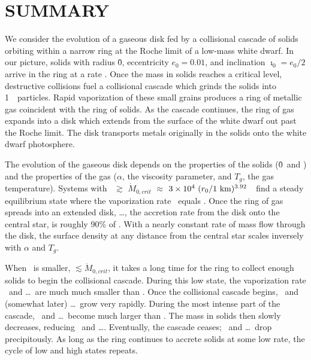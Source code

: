 \documentclass[12pt,preprint]{aastex}
\begin{document}
\begin{itemize}
\end{itemize}

\section{SUMMARY}
\label{sec: summary}

We consider the evolution of a gaseous disk fed by a collisional cascade
of solids orbiting
within a narrow ring at the Roche limit of a low-mass white dwarf. In our
picture, solids with radius \r0, eccentricity $e_0 = 0.01$, and inclination 
$\imath_0 = e_0/2$ arrive in the ring at a rate \mdotz. Once the mass in 
solids reaches a critical level, destructive collisions fuel a collisional 
cascade which grinds the solids into 1~\mum\ particles.  Rapid vaporization 
of these small grains produces a ring of metallic gas coincident with the ring
of solids. As the cascade continues, the ring of gas expands into a disk which 
extends from the surface of the white dwarf out past the Roche limit.  The 
disk transports metals originally in the solids onto the white dwarf 
photosphere. 

The evolution of the gaseous disk depends on the properties of the solids (\r0\ and 
\mdotz) and the properties of the gas ($\alpha$, the viscosity parameter, and $T_g$, 
the gas temperature). Systems with \mdotz\ $\gtrsim$ $ \dot{M}_{0, crit}$ $\approx$ 
$3 \times 10^4 ~ (r_0 / {\rm 1~km})^{3.92}$~\gs\ find a steady equilibrium 
state where the vaporization rate \mdotv\ equals \mdotz. Once the ring of gas
spreads into an extended disk, \mdots, the accretion rate from the disk onto 
the central star, is roughly 90\% of \mdotz. With a nearly constant rate of 
mass flow through the disk, the surface density at any distance from the 
central star scales inversely with $\alpha$ and $T_g$. 

When \mdotz\ is smaller, $\lesssim \dot{M}_{0, crit}$, it takes a long time for 
the ring to collect enough solids to begin the collisional cascade. During this 
low state, the vaporization rate \mdotv\ and \mdots\ are much much smaller than 
\mdotz. Once the collisional cascade begins, \mdotv\ and (somewhat later) 
\mdots\ grow very rapidly. During the most intense part of the cascade, 
\mdotv\ and \mdots\ become much larger than \mdotz. The mass in solids then
slowly decreases, reducing \mdotv\ and \mdots. Eventually, the cascade ceases;
\mdotv\ and \mdots\ drop precipitously. As long as the ring continues to accrete
solids at some low rate, the cycle of low and high states repeats.
\end{document}
